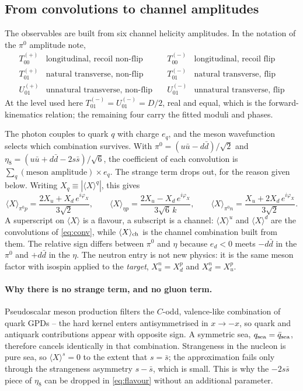 \subsection{From convolutions to channel amplitudes}

The observables are built from six channel helicity amplitudes.  In the
notation of the $\pi^0$ amplitude note,
\[
\begin{array}{llll}
T_{00}^{(+)} & \text{longitudinal, recoil non-flip} &\quad
T_{00}^{(-)} & \text{longitudinal, recoil flip}\\
T_{01}^{(+)} & \text{natural transverse, non-flip} &\quad
T_{01}^{(-)} & \text{natural transverse, flip}\\
U_{01}^{(+)} & \text{unnatural transverse, non-flip} &\quad
U_{01}^{(-)} & \text{unnatural transverse, flip}
\end{array}
\]
At the level used here $T_{01}^{(-)} = U_{01}^{(-)} = D/2$, real and equal,
which is the forward-kinematics relation; the remaining four carry the fitted
moduli and phases.

The photon couples to quark $q$ with charge $e_q$, and the meson wavefunction
selects which combination survives.  With
$\pi^0 = (u\bar u - d\bar d)/\sqrt2$ and
$\eta_8 = (u\bar u + d\bar d - 2s\bar s)/\sqrt6$, the coefficient of each
convolution is $\sum_q (\text{meson amplitude}) \times e_q$.  The strange term
drops out, for the reason given below.  Writing $X_q \equiv |\langle X\rangle^q|$, this gives
\begin{equation}
\langle X\rangle_{\pi^0 p} = \frac{2X_u + X_d\,e^{i\varphi_X}}{3\sqrt2},
\qquad
\langle X\rangle_{\eta p} = \frac{2X_u - X_d\,e^{i\varphi_X}}{3\sqrt6\,k},
\qquad
\langle X\rangle_{\pi^0 n} = \frac{X_u + 2X_d\,e^{i\varphi_X}}{3\sqrt2}.
\label{eq:flavour}
\end{equation}
A superscript on $\langle X\rangle$ is a flavour, a subscript is a channel:
$\langle X\rangle^u$ and $\langle X\rangle^d$ are the convolutions of
\eqref{eq:conv}, while $\langle X\rangle_{\rm ch}$ is the channel combination
built from them.  The relative sign differs between $\pi^0$ and $\eta$
because $e_d < 0$ meets
$-d\bar d$ in the $\pi^0$ and $+d\bar d$ in the $\eta$.  The neutron entry is
not new physics: it is the same meson factor with isospin applied to the
\emph{target}, $X_u^n = X_d^p$ and $X_d^n = X_u^p$.

\paragraph{Why there is no strange term, and no gluon term.}
Pseudoscalar meson production filters the $C$-odd, valence-like combination of
quark GPDs -- the hard kernel enters antisymmetrised in $x \to -x$, so quark
and antiquark contributions appear with opposite sign.  A symmetric sea,
$q_{\rm sea} = \bar q_{\rm sea}$, therefore cancels identically in that
combination.  Strangeness in the nucleon is pure sea, so
$\langle X\rangle^s = 0$ to the extent that $s = \bar s$; the approximation
fails only through the strangeness asymmetry $s - \bar s$, which is small.
This is why the $-2s\bar s$ piece of $\eta_8$ can be dropped in
\eqref{eq:flavour} without an additional parameter.

